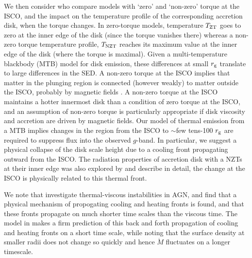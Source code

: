 \documentclass{nature}
\begin{document}
We then consider \cite{Zimmerman2005} who compare models with `zero' and `non-zero' torque at the ISCO, and the impact on the temperature profile of the corresponding accretion disk, when the torque changes.  In zero-torque models, temperature $T_{\rm ZT}$ goes to zero at the inner edge of the disk (since the torque vanishes there) whereas a non-zero torque temperature profile, $T_{\rm NZT}$ reaches its maximum value at the inner edge of the disk (where the torque is maximal).  Given a multi-temperature blackbody (MTB) model for disk emission, these differences at small $r_{\rm g}$ translate to large differences in the SED.  A non-zero torque at the ISCO implies that matter in the plunging region is connected (however weakly) to matter outside the ISCO, probably by magnetic fields \cite[e.g., ][]{Gammie1999, Agol_Krolik2000}. A non-zero torque at the ISCO maintains a hotter innermost disk than a condition of zero torque at the ISCO, and an assumption of non-zero torque is particularly appropriate if disk viscosity and accretion are driven by magnetic fields. Our model of thermal emission from a MTB implies changes in the region from the ISCO to $\sim$few tens-100 $r_{\rm g}$ are required to suppress flux into the observed $g$-band. In particular, we suggest a physical collapse of the disk scale height due to a cooling front propagating outward from the ISCO. The radiation properties of accretion disk with a NZTs at their inner edge was also explored by \cite{Cao2003} and \cite{Cannizzo1998b} describe in detail, the change at the ISCO is physically related to this thermal front. 

We note that \cite{Hameury2009} investigate thermal-viscous instabilities in AGN, and find that a physical mechanism of propogating cooling and heating fronts is found, and that these fronts propagate on much shorter time scales than the viscous time.  The model in \cite{Hameury2009} makes a firm prediction of this back and forth propagation of cooling and heating fronts on a short time scale, while noting that the surface density at smaller radii does not change so quickly and hence $\dot{M}$ fluctuates on a longer timescale. 
\end{document}

